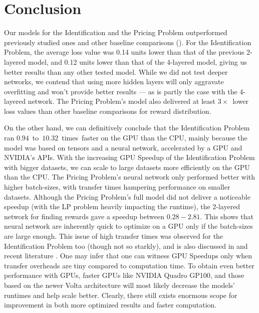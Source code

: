 \chapter{Conclusion} \label{sec:Conclusion}
Our models for the Identification and the Pricing Problem outperformed previously studied ones \cite{Xue2016Avi2} and other baseline comparisons (). For the Identification Problem, the average loss value was 0.14 units lower than that of the previous 2-layered model, and 0.12 units lower than that of the 4-layered model, giving us better results than any other tested model. While we did not test deeper networks, we contend that using more hidden layers will only aggravate overfitting and won't provide better results --- as is partly the case with the 4-layered network. The Pricing Problem's model also delivered at least $3\times$~lower loss values than other baseline comparisons for reward distribution.

On the other hand, we can definitively conclude that the Identification Problem ran $0.94$~to~$10.32$~times~faster on the GPU than the CPU, mainly because the model was based on tensors and a neural network, accelerated by a GPU and NVIDIA's APIs. With the increasing GPU Speedup of the Identification Problem with bigger datasets, we can scale to large datasets more efficiently on the GPU than the CPU. The Pricing Problem's neural network only performed better with higher batch-sizes, with transfer times hampering performance on smaller datasets. Although the Pricing Problem's full model did not deliver a noticeable speedup (with the LP problem heavily impacting the runtime), the 2-layered network for finding rewards gave a speedup between $0.28-2.81$. This shows that neural network are inherently quick to optimize on a GPU only if the batch-sizes are large enough. This issue of high transfer times was observed for the Identification Problem too (though not so starkly), and is also discussed in  and recent literature \cite{ParallelNVIDIA,DemystifyingGPU} \cite[Appendix~B]{PattersonARM}. One may infer that one can witness GPU Speedups only when transfer overheads are tiny compared to computation time. To obtain even better performance with GPUs, faster GPUs like NVIDIA Quadro GP100, and those based on the newer Volta architecture will most likely decrease the models' runtimes and help scale better. Clearly, there still exists enormous scope for improvement in both more optimized results and faster computation.

